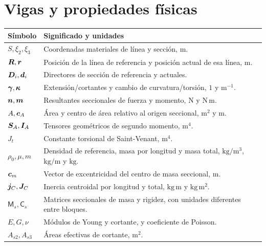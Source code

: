 \section{Vigas y propiedades físicas}
\begin{longtable}{p{}p{}}
\toprule Símbolo & Significado y unidades \\\midrule\endhead
$S,\xi_2,\xi_3$ & Coordenadas materiales de línea y sección, $\mathrm m$.\\
$\bm{R},\bm{r}$ & Posición de la línea de referencia y posición actual de esa línea, $\mathrm m$.\\
$\bm{D}_i,\bm{d}_i$ & Directores de sección de referencia y actuales.\\
$\bm{\gamma},\bm{\kappa}$ & Extensión/cortantes y cambio de curvatura/torsión, $1$ y $\mathrm{m^{-1}}$.\\
$\bm{n},\bm{m}$ & Resultantes seccionales de fuerza y momento, $\mathrm N$ y $\mathrm{N\,m}$.\\
$A,\bm{c}_A$ & Área y centro de área relativo al origen seccional, $\mathrm{m^2}$ y $\mathrm m$.\\
$\boldsymbol{S}_A,\boldsymbol{I}_A$ & Tensores geométricos de segundo momento, $\mathrm{m^4}$.\\
$J_t$ & Constante torsional de Saint-Venant, $\mathrm{m^4}$.\\
$\rho_0,\mu,m$ & Densidad de referencia, masa por longitud y masa total, $\mathrm{kg/m^3}$, $\mathrm{kg/m}$ y $\mathrm{kg}$.\\
$\bm{c}_m$ & Vector de excentricidad del centro de masa seccional, $\mathrm m$.\\
$\boldsymbol{j}_C,\boldsymbol{J}_C$ & Inercia centroidal por longitud y total, $\mathrm{kg\,m}$ y $\mathrm{kg\,m^2}$.\\
$\mathsf M_s,\mathsf C_s$ & Matrices seccionales de masa y rigidez, con unidades diferentes entre bloques.\\
$E,G,\nu$ & Módulos de Young y cortante, y coeficiente de Poisson.\\
$A_{s2},A_{s3}$ & Áreas efectivas de cortante, $\mathrm{m^2}$.\\
\bottomrule
\end{longtable}

